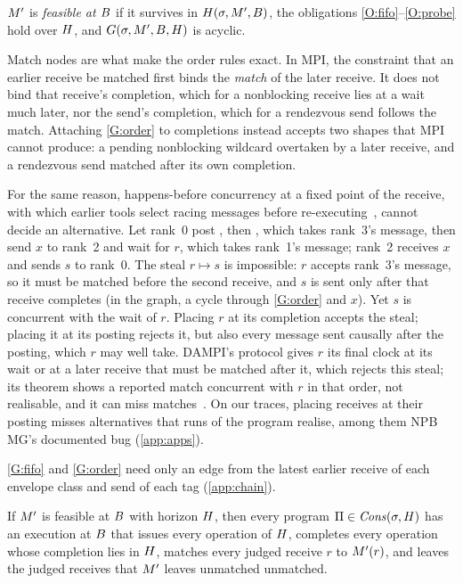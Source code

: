 \begin{definition}[Feasibility]
$M'$ is \emph{feasible at $B$} if it survives in $H(\sigma,M',B)$, the
obligations \ref{O:fifo}--\ref{O:probe} hold over $H$, and
$G(\sigma,M',B,H)$ is acyclic.
\end{definition}

Match nodes are what make the order rules exact. In MPI, the constraint that an earlier
receive be matched first binds the \emph{match} of the later receive. It does not bind
that receive's completion, which for a nonblocking receive lies at a wait much later, nor
the send's completion, which for a rendezvous send follows the match. Attaching
\ref{G:order} to completions instead accepts two shapes that MPI cannot produce: a pending
nonblocking wildcard overtaken by a later receive, and a rendezvous send matched after its own
completion.

For the same reason, happens-before concurrency at a fixed point of the receive, with which
earlier tools select racing messages before
re-executing~\citep{lei06reachability,gopalakrishnan11cacm}, cannot decide an alternative.
Let rank~0 post , then , which takes
rank~3's message, then send $x$ to rank~2 and wait for $r$, which takes rank~1's message;
rank~2 receives $x$ and sends $s$ to rank~0. The steal $r\mapsto s$ is impossible: $r$
accepts rank~3's message, so it must be matched before the second receive, and $s$ is sent
only after that receive completes (in the graph, a cycle through \ref{G:order} and $x$). Yet
$s$ is concurrent with the wait of $r$. Placing $r$ at its completion accepts the steal;
placing it at its posting rejects it, but also every message sent causally after the
posting, which $r$ may well take. DAMPI's protocol gives $r$ its final clock at its wait or at
a later receive that must be matched after it, which rejects this steal; its theorem shows a
reported match concurrent with $r$ in that order, not realisable, and it can miss
matches~\citep{vo11thesis}. On our traces, placing receives at their posting misses
alternatives that runs of the program realise, among them NPB MG's documented bug
(\cref{app:apps}).

\ref{G:fifo} and \ref{G:order} need only an edge from the latest earlier receive of each
envelope class and send of each tag (\cref{app:chain}).

\begin{theorem}[Soundness]
\label{thm:sound}
If $M'$ is feasible at $B$ with horizon $H$, then every program
$\Pi\in\mathit{Cons}(\sigma,H)$ has an execution at $B$ that issues every operation of
$H$, completes every operation whose completion lies in $H$, matches every judged
receive $r$ to $M'(r)$, and leaves the judged receives that $M'$ leaves unmatched
unmatched.
\end{theorem}

